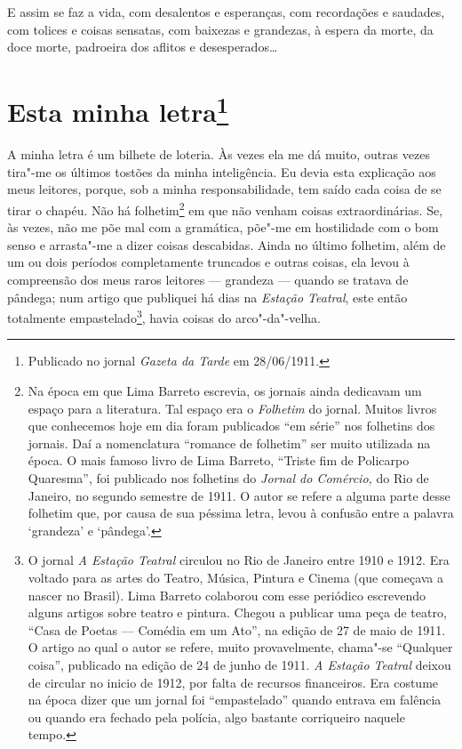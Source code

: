E assim se faz a vida, com desalentos e esperanças, com recordações e
saudades, com tolices e coisas sensatas, com baixezas e grandezas, à
espera da morte, da doce morte, padroeira dos aflitos e
desesperados\ldots{}



\chapter[Esta minha letra]{Esta minha letra\footnote[*]{Publicado no jornal \emph{Gazeta da Tarde} em 28/06/1911.}}

A minha letra é um bilhete de loteria. Às vezes ela me dá muito, outras
vezes tira"-me os últimos tostões da minha inteligência. Eu devia esta
explicação aos meus leitores, porque, sob a minha responsabilidade, tem
saído cada coisa de se tirar o chapéu. Não há folhetim\footnote{Na época
  em que Lima Barreto escrevia, os jornais ainda dedicavam um espaço
  para a literatura. Tal espaço era o \textit{Folhetim} do jornal.
  Muitos livros que conhecemos hoje em dia foram publicados ``em série''
  nos folhetins dos jornais. Daí a nomenclatura ``romance de folhetim''
  ser muito utilizada na época. O mais famoso livro de Lima Barreto,
  ``Triste fim de Policarpo Quaresma'', foi publicado nos folhetins do
  \emph{Jornal do Comércio,} do Rio de Janeiro, no segundo semestre de
  1911. O autor se refere a alguma parte desse folhetim que, por causa
  de sua péssima letra, levou à confusão entre a palavra `grandeza' e
  `pândega'.} em que não venham coisas extraordinárias. Se, às vezes,
não me põe mal com a gramática, põe"-me em hostilidade com o bom senso e
arrasta"-me a dizer coisas descabidas. Ainda no último folhetim, além de
um ou dois períodos completamente truncados e outras coisas, ela levou à
compreensão dos meus raros leitores --- grandeza --- quando se tratava
de pândega; num artigo que publiquei há dias na \emph{Estação Teatral},
este então totalmente empastelado\footnote{O jornal \emph{A Estação
  Teatral} circulou no Rio de Janeiro entre 1910 e 1912. Era voltado
  para as artes do Teatro, Música, Pintura e Cinema (que começava a
  nascer no Brasil). Lima Barreto colaborou com esse periódico
  escrevendo alguns artigos sobre teatro e pintura. Chegou a publicar
  uma peça de teatro, ``Casa de Poetas --- Comédia em um Ato'', na edição
  de 27 de maio de 1911. O artigo ao qual o autor se refere, muito
  provavelmente, chama"-se ``Qualquer coisa'', publicado na edição de 24
  de junho de 1911. \emph{A Estação Teatral} deixou de circular no
  inicio de 1912, por falta de recursos financeiros. Era costume na
  época dizer que um jornal foi ``empastelado'' quando entrava em
  falência ou quando era fechado pela polícia, algo bastante corriqueiro
  naquele tempo.}, havia coisas do arco"-da"-velha.

